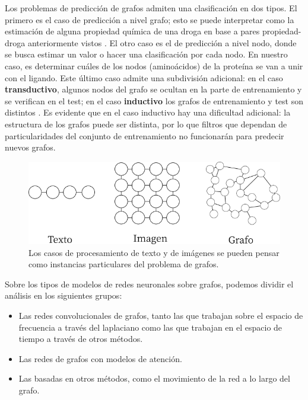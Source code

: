 \documentclass[
    left=2.0cm,         %
    right=2.0cm,        %
    top=2.0cm,          %
    bottom=2.5cm,         %
    bindingoffset=6mm,  %
    nohyphenation=false %
]{eiti/eiti-thesis}
\begin{document}
Los problemas de predicción de grafos admiten una clasificación en dos tipos. El primero
es el caso de predicción a nivel grafo; esto se puede interpretar como
la estimación de alguna propiedad química de una droga en base a pares propiedad-droga %
anteriormente vistos \cite{gilmer2017neuralmessagepassing}.
El otro caso es el de predicción a nivel nodo, donde se busca estimar un valor
o hacer una clasificación por cada nodo. En nuestro caso, es determinar cuáles
de los nodos (aminoácidos) de la proteína se van a unir con el ligando. Este último
caso admite una subdivisión adicional: en el caso \textbf{transductivo}, algunos
nodos del grafo se ocultan en la parte de entrenamiento y se verifican en el test; en el
caso \textbf{inductivo} los grafos de entrenamiento y test son distintos \cite{GAT}. Es %
evidente que en el caso inductivo hay una dificultad adicional: la estructura
de los grafos puede ser distinta, por lo que filtros que dependan de particularidades %
del conjunto de entrenamiento no funcionarán para predecir nuevos grafos. %

\begin{figure}
\centering
  \includegraphics[width=0.8\linewidth]{img/img_texto_imagen_grafo.png}
  \caption{Los casos de procesamiento de texto y de imágenes se pueden pensar como instancias particulares del problema de grafos.}
  \label{fig:boat1}
\end{figure}


Sobre los tipos de modelos de redes neuronales sobre grafos, podemos dividir el
análisis en los siguientes grupos: 

\begin{itemize}  
\item Las redes convolucionales de grafos, tanto las que trabajan sobre el espacio
de frecuencia a través del laplaciano como las que trabajan en el espacio de tiempo
a través de otros métodos.
\item Las redes de grafos con modelos de atención.
\item Las basadas en otros métodos, como el movimiento de la red a lo largo del grafo.
\end{itemize}
\end{document}
